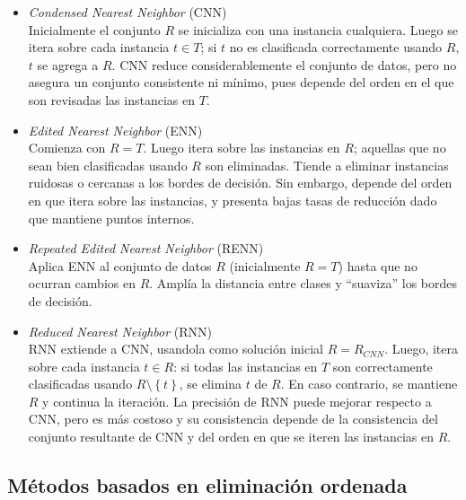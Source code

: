 \begin{itemize}
\item \emph{Condensed Nearest Neighbor} (CNN) \cite{Hart:2006:CNN:2263267.2267647}\\
Inicialmente el conjunto $R$ se inicializa con una instancia cualquiera. Luego se itera sobre cada instancia $t \in T$; si $t$ no es clasificada correctamente usando $R$, $t$ se agrega a $R$.
CNN reduce considerablemente el conjunto de datos, pero no asegura un conjunto consistente ni mínimo, pues depende del orden en el que son revisadas las instancias en $T$.
\item \emph{Edited Nearest Neighbor} (ENN) \cite{wilson1972asymptotic}\\
Comienza con $R = T$. Luego itera sobre las instancias en $R$; aquellas que no sean bien clasificadas usando $R$ son eliminadas. Tiende a eliminar instancias ruidosas o cercanas a los bordes de decisión. Sin embargo, depende del orden en que itera sobre las instancias, y presenta bajas tasas de reducción dado que mantiene puntos internos.
\item \emph{Repeated Edited Nearest Neighbor} (RENN) \cite{wilson1972asymptotic}\\
Aplica ENN al conjunto de datos $R$ (inicialmente $R = T$) hasta que no ocurran cambios en $R$. Amplía la distancia entre clases y ``suaviza'' los bordes de decisión.
\item \emph{Reduced Nearest Neighbor} (RNN) \cite{DBLP:journals/tit/Gates72}\\
RNN extiende a CNN, usandola como solución inicial $R = R_{CNN}$. Luego, itera sobre cada instancia $t \in R$: si todas las instancias en $T$ son correctamente clasificadas usando $R\setminus\left\lbrace t \right\rbrace$, se elimina $t$ de $R$. En caso contrario, se mantiene $R$ y continua la iteración. La precisión de RNN puede mejorar respecto a CNN, pero es más costoso y su consistencia depende de la consistencia del conjunto resultante de CNN y del orden en que se iteren las instancias en $R$.
\end{itemize}

\subsection{Métodos basados en eliminación ordenada}

